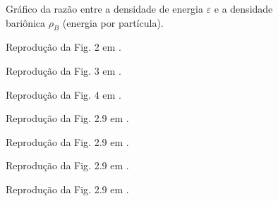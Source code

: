 \begin{figure}
	
	\caption{Gráfico da razão entre a densidade de energia $\varepsilon$ e a densidade bariônica $\rho_B$ (energia por partícula). \protect}
	\label{Fig:energy_density_per_particle_NJL-D_1}
\end{figure}


\begin{figure}
	
	\caption{Reprodução da Fig. 2 em \textcite{japoneses2}. \protect}
	\label{Fig:Mass_Tsue}
\end{figure}

\begin{figure}
	
	\caption{Reprodução da Fig. 3 em \textcite{japoneses2}. \protect}
	\label{Fig:Dens_Tsue}
\end{figure}

\begin{figure}
	
	\caption{Reprodução da Fig. 4 em \textcite{japoneses2}. \protect}
	\label{Fig:Press_Tsue}
\end{figure}


\begin{figure}
	
	\caption{Reprodução da Fig. 2.9 em \textcite{Buballa}. \protect}
	\label{Fig:Buballa_2.9_1}
\end{figure}

\begin{figure}
	
	\caption{Reprodução da Fig. 2.9 em \textcite{Buballa}. \protect}
	\label{Fig:Buballa_2.9_2}
\end{figure}

\begin{figure}
	
	\caption{Reprodução da Fig. 2.9 em \textcite{Buballa}. \protect}
	\label{Fig:Buballa_2.9_3}
\end{figure}

\begin{figure}
	
	\caption{Reprodução da Fig. 2.9 em \textcite{Buballa}. \protect}
	\label{Fig:Buballa_2.9_4}
\end{figure}

